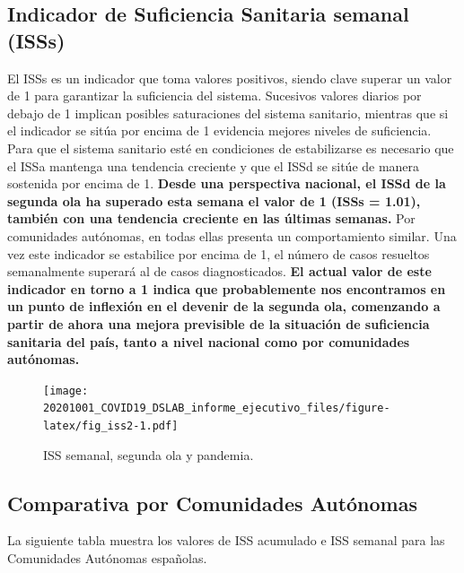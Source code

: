 \documentclass[
  11pt,
]{article}
\begin{document}
\clearpage

\hypertarget{indicador-de-suficiencia-sanitaria-semanal-isss}{%
\subsection{Indicador de Suficiencia Sanitaria semanal
(ISSs)}\label{indicador-de-suficiencia-sanitaria-semanal-isss}}

El ISSs es un indicador que toma valores positivos, siendo clave superar
un valor de 1 para garantizar la suficiencia del sistema. Sucesivos
valores diarios por debajo de 1 implican posibles saturaciones del
sistema sanitario, mientras que si el indicador se sitúa por encima de 1
evidencia mejores niveles de suficiencia. Para que el sistema sanitario
esté en condiciones de estabilizarse es necesario que el ISSa mantenga
una tendencia creciente y que el ISSd se sitúe de manera sostenida por
encima de 1. \textbf{Desde una perspectiva nacional, el ISSd de la
segunda ola ha superado esta semana el valor de 1 (ISSs = 1.01), también
con una tendencia creciente en las últimas semanas.} Por comunidades
autónomas, en todas ellas presenta un comportamiento similar. Una vez
este indicador se estabilice por encima de 1, el número de casos
resueltos semanalmente superará al de casos diagnosticados. \textbf{El
actual valor de este indicador en torno a 1 indica que probablemente nos
encontramos en un punto de inflexión en el devenir de la segunda ola,
comenzando a partir de ahora una mejora previsible de la situación de
suficiencia sanitaria del país, tanto a nivel nacional como por
comunidades autónomas.}

\begin{figure}
\centering
\texttt{[image: 20201001\_COVID19\_DSLAB\_informe\_ejecutivo\_files/figure-latex/fig\_iss2-1.pdf]}
\caption{\label{fig:fig_iss2} ISS semanal, segunda ola y pandemia.}
\end{figure}

\clearpage

\hypertarget{comparativa-por-comunidades-autuxf3nomas}{%
\subsection{Comparativa por Comunidades
Autónomas}\label{comparativa-por-comunidades-autuxf3nomas}}

La siguiente tabla muestra los valores de ISS acumulado e ISS semanal
para las Comunidades Autónomas españolas. \vspace{0.2cm}
\end{document}
